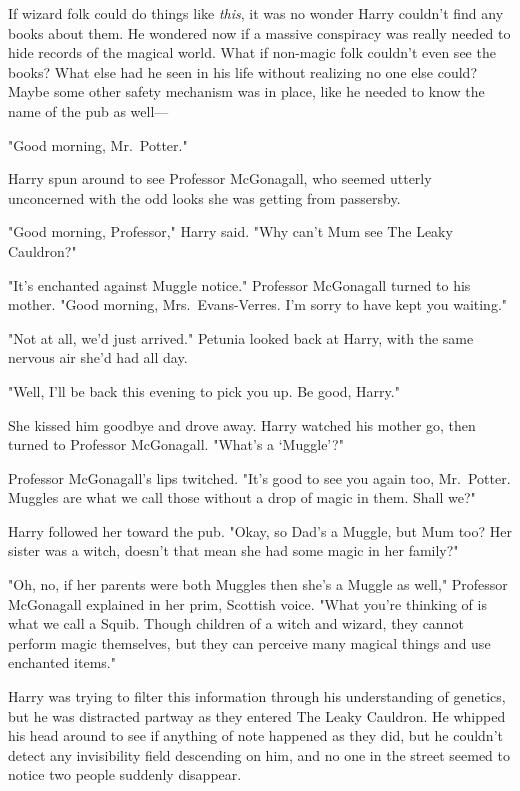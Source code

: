 If wizard folk could do things like \emph{this}, it was no wonder
Harry couldn't find any books about them. He wondered
now if a massive conspiracy was really needed to hide
records of the magical world. What if non-magic folk
couldn't even see the books? What else had he seen in
his life without realizing no one else could? Maybe some
other safety mechanism was in place, like he needed to
know the name of the pub as well—

"Good morning, Mr.~Potter."

Harry spun around to see Professor McGonagall, who
seemed utterly unconcerned with the odd
looks she was getting from passersby.

"Good morning, Professor," Harry said. "Why can't Mum
see The Leaky Cauldron?"

"It's enchanted against Muggle notice." Professor McGonagall
turned to his mother. "Good morning, Mrs.~Evans-Verres.
I'm sorry to have kept you waiting."

"Not at all, we'd just arrived." Petunia looked back at
Harry, with the same nervous air she'd had all day.

"Well, I'll be back this evening to pick you up. Be good, Harry."

She kissed him goodbye and drove away. Harry watched his mother
go, then turned to Professor McGonagall. "What's a `Muggle'?"

Professor McGonagall's lips twitched. "It's good to see you
again too, Mr.~Potter. Muggles are what we call those
without a drop of magic in them. Shall we?"

Harry followed her toward the pub. "Okay, so Dad's a
Muggle, but Mum too? Her sister was a witch, doesn't that
mean she had some magic in her family?"

"Oh, no, if her parents were both Muggles then she's
a Muggle as well," Professor McGonagall explained in her prim,
Scottish voice. "What you're thinking of is what we call a
Squib. Though children of a witch and wizard, they cannot
perform magic themselves, but they can perceive
many magical things and use enchanted items."

Harry was trying to filter this information through his
understanding of genetics, but he was distracted partway as
they entered The Leaky Cauldron. He whipped his head
around to see if anything of note happened as they did,
but he couldn't detect any invisibility field descending on him,
and no one in the street seemed to notice two people
suddenly disappear.

